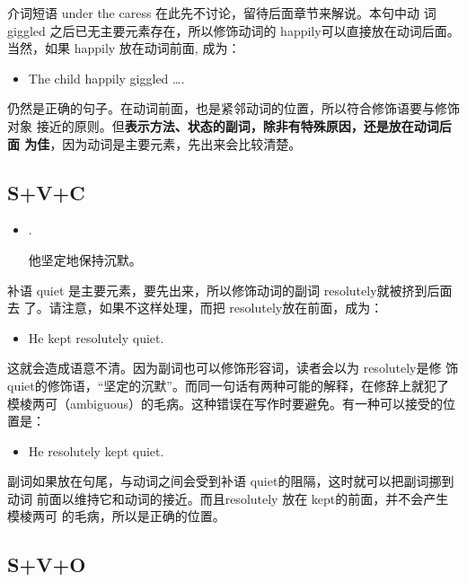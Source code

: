 介词短语 under the caress 在此先不讨论，留待后面章节来解说。本句中动
词giggled 之后已无主要元素存在，所以修饰动词的 happily可以直接放在动词后面。
当然，如果 happily 放在动词前面, 成为：
\begin{itemize}
\item  The child happily giggled \ldots.
\end{itemize}
仍然是正确的句子。在动词前面，也是紧邻动词的位置，所以符合修饰语要与修饰对象
接近的原则。但\textbf{表示方法、状态的副词，除非有特殊原因，还是放在动词后面
  为佳}，因为动词是主要元素，先出来会比较清楚。

\subsection{S+V+C}

\begin{itemize}
\item {}   .

  他坚定地保持沉默。
\end{itemize}
补语 quiet 是主要元素，要先出来，所以修饰动词的副词 resolutely就被挤到后面去
了。请注意，如果不这样处理，而把 resolutely放在前面，成为：

\begin{itemize}
\item He kept resolutely quiet.
\end{itemize}
这就会造成语意不清。因为副词也可以修饰形容词，读者会以为 resolutely是修
饰 quiet的修饰语，“坚定的沉默”。而同一句话有两种可能的解释，在修辞上就犯了
模棱两可（ambiguous）的毛病。这种错误在写作时要避免。有一种可以接受的位置是：
\begin{itemize}
\item  He resolutely kept quiet.
\end{itemize}
副词如果放在句尾，与动词之间会受到补语 quiet的阻隔，这时就可以把副词挪到动词
前面以维持它和动词的接近。而且resolutely 放在 kept的前面，并不会产生模棱两可
的毛病，所以是正确的位置。

\subsection{S+V+O}

